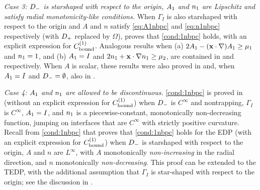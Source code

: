 \emph{Case 3: $D_{-}$ is starshaped with respect to the origin, $A_{1}$ and $n_{1}$ are Lipschitz and satisfy radial monotonicity-like conditions.}
When $\Gamma_I$ is also starshaped with respect to the origin and $A$ and $n$ satisfy \cref{eq:A1nbpc} and \cref{eq:n1nbpc} respectively (with $D_{+}$ replaced by $\Omega$), 
\cite[Theorem A.6(i)]{GrPeSp:19} proves that
\cref{cond:1nbpc} holds, with an explicit expression for $C^{(1)}_{\rm bound}$. Analogous results when (a) $2A_{1} - (\mathbf{x}\cdot\nabla)A_{1} \geq \mu_1$ and $n_{1}= 1$,
and  (b) $A_{1}= I$ and  $2n_{1} + \mathbf{x} \cdot \nabla n_{1} \geq \mu_2$, 
are contained in \cite[Theorem A.6(ii)]{GrPeSp:19} and \cite[Theorem A.6(iii)]{GrPeSp:19} respectively.
When $A$ is scalar, these results were also proved in \cite[Theorem 1]{BrGaPe:17} and, when $A_{1}= I$ and $D_{-}=\emptyset$, also in \cite[Theorem 3.2]{GrSa:18}.

\emph{Case 4: %
 $A_{1}$ and $n_{1}$ are allowed to be discontinuous.}
\cref{cond:1nbpc} is proved in \cite{CaVo:10} (without an explicit expression for $C^{(1)}_{\rm bound}$) when $D_{-}$ is $C^\infty$ and nontrapping, $\Gamma_I$ is $C^\infty$, $A_{1}= I $, and $n_{1}$ is a piecewise-constant, monotonically non-decreasing function, jumping on interfaces that are $C^\infty$ with strictly positive curvature.
Recall from \cref{cond:1nbpc} that \cite[Theorem 2.7]{GrPeSp:19} proves that \cref{cond:1nbpc} holds for the EDP (with an explicit expression for $C^{(1)}_{\rm bound}$) when $D_{-}$ is starshaped with respect to the origin, $A$ and $n$ are $L^\infty$, with $A$ monotonically \emph{non-increasing} in the radial direction, and $n$ monotonically \emph{non-decreasing}. This proof can be extended to the TEDP, with the additional assumption that $\Gamma_I$ is star-shaped with respect to the origin; see the discussion in \cite[Section A.2]{GrPeSp:19}.


%
%
%

